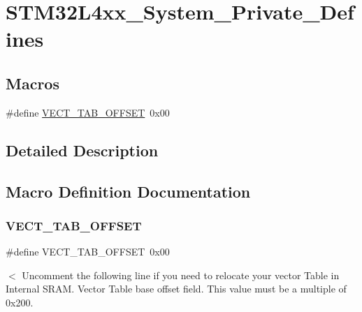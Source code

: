 \hypertarget{group___s_t_m32_l4xx___system___private___defines}{}\section{S\+T\+M32\+L4xx\+\_\+\+System\+\_\+\+Private\+\_\+\+Defines}
\label{group___s_t_m32_l4xx___system___private___defines}
\subsection*{Macros}
\begin{DoxyCompactItemize}
\item 
\#define \mbox{\hyperlink{group___s_t_m32_l4xx___system___private___defines_ga40e1495541cbb4acbe3f1819bd87a9fe}{V\+E\+C\+T\+\_\+\+T\+A\+B\+\_\+\+O\+F\+F\+S\+ET}}~0x00
\end{DoxyCompactItemize}


\subsection{Detailed Description}


\subsection{Macro Definition Documentation}
\mbox{\label{group___s_t_m32_l4xx___system___private___defines_ga40e1495541cbb4acbe3f1819bd87a9fe}} 
\subsubsection{\texorpdfstring{V\+E\+C\+T\+\_\+\+T\+A\+B\+\_\+\+O\+F\+F\+S\+ET}{VECT\_TAB\_OFFSET}}
{\footnotesize\ttfamily \#define V\+E\+C\+T\+\_\+\+T\+A\+B\+\_\+\+O\+F\+F\+S\+ET~0x00}

$<$ Uncomment the following line if you need to relocate your vector Table in Internal S\+R\+AM. Vector Table base offset field. This value must be a multiple of 0x200. 